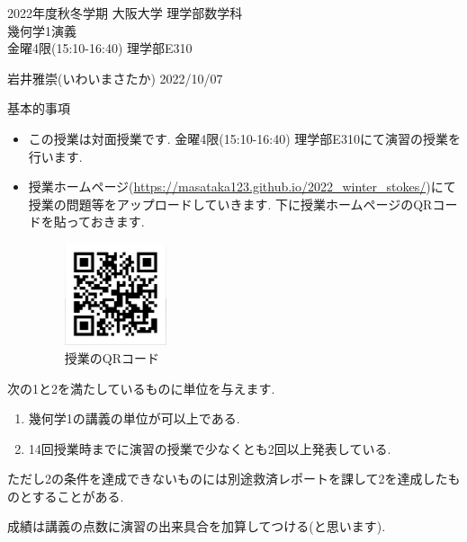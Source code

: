 \documentclass[dvipdfmx,a4paper,11pt]{article}
\theoremstyle{definition}
\begin{document}

\newpage
\begin{center}
{\Large 2022年度秋冬学期 大阪大学 理学部数学科 \\ 幾何学1演義} \\
金曜4限(15:10-16:40) 理学部E310
\end{center}
\begin{flushright}
 岩井雅崇(いわいまさたか) 2022/10/07 \\
\end{flushright}
{\large 基本的事項}
\begin{itemize}
  \setlength{\parskip}{0cm} %
  \setlength{\itemsep}{0cm} %
\item この授業は対面授業です. 金曜4限(15:10-16:40) 理学部E310にて演習の授業を行います.
\item 授業ホームページ(\url{https://masataka123.github.io/2022_winter_stokes/})にて授業の問題等をアップロードしていきます. 
下に授業ホームページのQRコードを貼っておきます. 
\begin{figure}[htbp]
\begin{center}
 \includegraphics[height=30mm, width=30mm]{stokes.png}
 \caption*{授業のQRコード}
\end{center}
\end{figure}
\end{itemize}

\hspace{-18pt}{\large 成績に関して}

次の1と2を満たしているものに単位を与えます.
\begin{enumerate}
  \setlength{\parskip}{0cm} %
  \setlength{\itemsep}{0cm} %
\item 幾何学1の講義の単位が可以上である.
\item 14回授業時までに演習の授業で少なくとも2回以上発表している.
\end{enumerate}
ただし2の条件を達成できないものには別途救済レポートを課して2を達成したものとすることがある.

成績は講義の点数に演習の出来具合を加算してつける(と思います).
\end{document}
